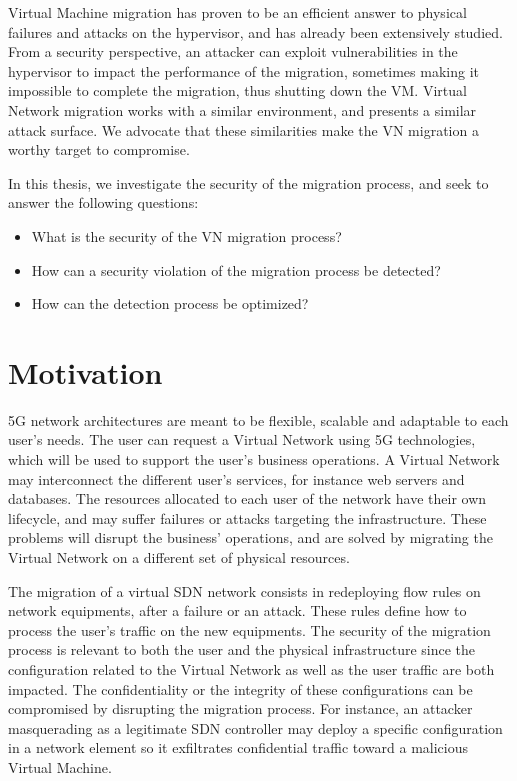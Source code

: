 Virtual Machine migration has proven to be an efficient answer to physical failures and attacks on the hypervisor, and has already been extensively studied. From a security perspective, an attacker can exploit vulnerabilities in the hypervisor to impact the performance of the migration, sometimes making it impossible to complete the migration, thus shutting down the VM.
Virtual Network migration works with a similar environment, and presents a similar attack surface. We advocate that these similarities make the VN migration a worthy target to compromise.

In this thesis, we investigate the security of the migration process, and seek to answer the following questions:

\begin{itemize}
    \item What is the security of the VN migration process?
    \item How can a security violation of the migration process be detected?
    \item How can the detection process be optimized?
\end{itemize}

\section{Motivation}
5G network architectures are meant to be flexible, scalable and adaptable to each user's needs.
The user can request a Virtual Network using 5G technologies, which will be used to support the user's business operations. A Virtual Network may interconnect the different user's services, for instance web servers and databases. 
The resources allocated to each user of the network have their own lifecycle, and may suffer failures or attacks targeting the infrastructure. These problems will disrupt the business' operations, and are solved by migrating the Virtual Network on a different set of physical resources.

The migration of a virtual SDN network consists in redeploying flow rules on network equipments, after a failure or an attack. These rules define how to process the user's traffic on the new equipments.
The security of the migration process is relevant to both the user and the physical infrastructure since the configuration related to the Virtual Network as well as the user traffic are both impacted. 
The confidentiality or the integrity of these configurations can be compromised by disrupting the migration process. For instance,  an attacker masquerading as a legitimate SDN controller may deploy a specific configuration in a network element so it exfiltrates confidential traffic toward a malicious Virtual Machine.

